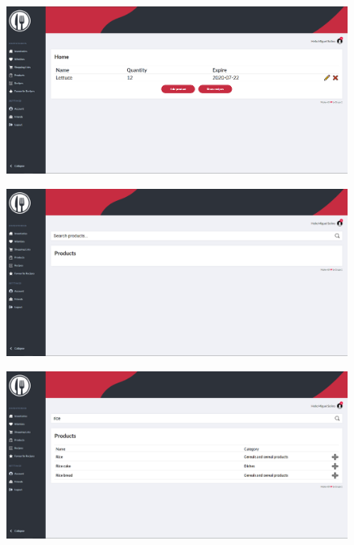 \documentclass[a4paper]{report}
\begin{document}
    \begin{figure}[H]
        \centering
            \includegraphics[width=\textwidth]{images/produto_final/pagina_iventario_partilhado.png}
    \end{figure}

    \begin{figure}[H]
        \centering
            \includegraphics[width=\textwidth]{images/produto_final/procura_de_produtos.png}
    \end{figure}

    \begin{figure}[H]
        \centering
            \includegraphics[width=\textwidth]{images/produto_final/procura_de_produtos_efetuada.png}
    \end{figure}
\end{document}

